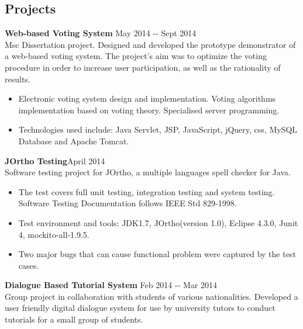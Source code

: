 \documentclass[margin]{res}
\begin{document}
\begin{resume}
\section{Projects}
{\bf Web-based Voting System} \hfill May 2014 -­‐ Sept 2014\\
Msc Dissertation
project. Designed and developed the prototype demonstrator of a web-based voting
system. The project's aim was to optimize the voting procedure in order to
increase user participation, as well as the rationality of results.
\begin{itemize}
  \item Electronic voting system design and implementation. Voting algorithms
  implementation based on voting theory. Specialised server programming.
\item Technologies used
include: Java Servlet, JSP, JavaScript, jQuery, css, MySQL Database and Apache
Tomcat.
\end{itemize}
{\bf JOrtho Testing}\hfill April 2014\\
Software testing project for JOrtho, a multiple languages spell checker for
Java.
\begin{itemize}
  \item The test covers full
unit testing, integration testing and system testing. Software Testing
Documentation follows IEEE Std 829-1998. 
\item Test environment and tools: JDK1.7, JOrtho(version 1.0), Eclipse 4.3.0,
Junit 4, mockito-all-1.9.5.
\item Two major bugs that can cause functional problem were captured by the test
cases.
\end{itemize}
{\bf Dialogue Based Tutorial System} \hfill Feb 2014 -­‐ Mar 2014\\
Group project in collaboration with students of various nationalities. Developed a user friendly digital dialogue system for use by university tutors to conduct tutorials for a small group of students.

\end{resume}
\end{document}

